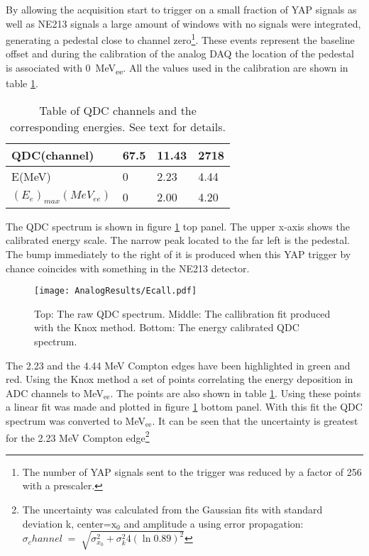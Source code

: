 \documentclass[main.tex]{subfiles}
\begin{document}
By allowing the acquisition start to trigger on a small fraction of YAP signals as well as NE213 signals a large amount of windows with no signals were integrated, generating a pedestal close to channel zero\footnote{The number of YAP signals sent to the trigger was reduced by a factor of 256 with a prescaler.}. These events represent the baseline offset and during the calibration of the analog DAQ the location of the pedestal is associated with \SI{0}{MeV_{ee}}. All the values used in the calibration are shown in table \ref{tab:knox_a}.

\begin{table}[hb]
	\center
	\begin{tabular}{|l|l|l|l|}
	\hline
	QDC(channel)             & 67.5 & 11.43 & 2718 \\
	\hline
	E(MeV)          & 0    & 2.23  & 4.44 \\
	\hline
	$(E_{e})_{max}(MeV_{ee})$ & 0    & 2.00  & 4.20 \\
	\hline
	\end{tabular}
   	\captionsetup{width=0.435\linewidth}
	\caption{Table of QDC channels and the corresponding energies. See text for details.}
	\label{tab:knox_a}
\end{table}

The QDC spectrum is shown in figure \ref{fig:qdc_a} top panel. The upper x-axis shows the calibrated energy scale. The narrow peak located to the far left is the pedestal. The bump immediately to the right of it is produced when this YAP trigger by chance coincides with something in the NE213 detector.
\begin{figure}[ht!]
    \centering
        \texttt{[image: AnalogResults/Ecall.pdf]}
        \caption[Energy calibration of the analog setup]{Top: The raw QDC spectrum. Middle: The callibration fit produced with the Knox method. Bottom: The energy calibrated QDC spectrum.}
    \label{fig:qdc_a}
\end{figure}

The 2.23 and the 4.44 MeV Compton edges have been highlighted in green and red. Using the Knox method a set of points correlating the energy deposition in ADC channels to \si{\MeV}$_\text{ee}$. The points are also shown in table \ref{tab:knox_a}. Using these points a linear fit was made and plotted in figure \ref{fig:qdc_a} bottom panel. With this fit the QDC spectrum was converted to \si{\MeV}$_\text{ee}$. It can be seen that the uncertainty is greatest for the 2.23 \si{\MeV} Compton edge\footnote{The uncertainty was calculated from the Gaussian fits with standard deviation k, center=$\text{x}_\text{0}$ and amplitude a using error propagation: $\sigma_channel\;=\;\sqrt{\sigma_{x_0}^2 + \sigma_{k}^2 4\left(\ln0.89\right)^2 }$}
\end{document}
